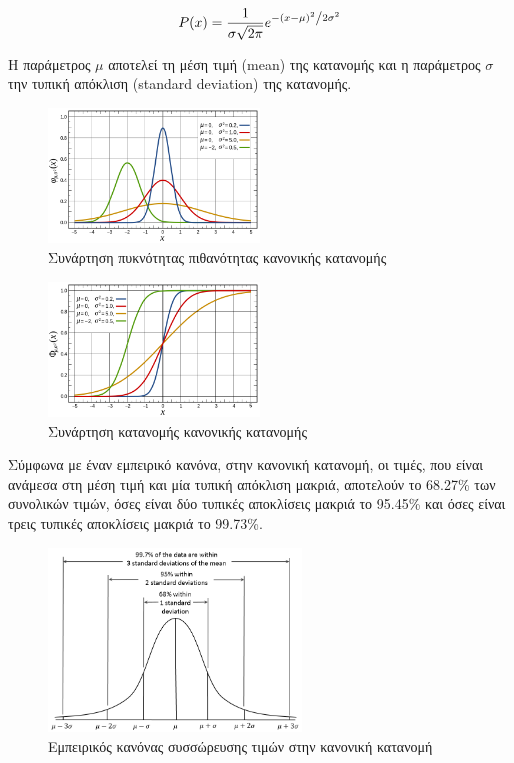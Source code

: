 \[P(x) = \frac{1}{{\sigma \sqrt {2\pi } }}e^{{{ - \left( {x - \mu } \right)^2 } \mathord{\left/ {\vphantom {{ - \left( {x - \mu } \right)^2 } {2\sigma ^2 }}} \right. \kern-\nulldelimiterspace} {2\sigma ^2 }}}\]

Η παράμετρος \(\mu\) αποτελεί τη μέση τιμή (mean) της κατανομής και η παράμετρος \(\sigma\) την τυπική απόκλιση (standard deviation) της κατανομής. 

\begin{figure}[H]
  \centering
  \includegraphics[width=0.5\textwidth]{figures/gauss_1.png}
  \caption{Συνάρτηση πυκνότητας πιθανότητας κανονικής κατανομής}
\end{figure}

\begin{figure}[H]
  \centering
  \includegraphics[width=0.5\textwidth]{figures/gauss_2.png}
  \caption{Συνάρτηση κατανομής κανονικής κατανομής}
\end{figure}

Σύμφωνα με έναν 
εμπειρικό κανόνα, στην κανονική κατανομή, οι τιμές, που είναι ανάμεσα στη μέση τιμή και μία τυπική απόκλιση μακριά, αποτελούν το 68.27\% των συνολικών τιμών, 
όσες είναι δύο τυπικές αποκλίσεις μακριά το 95.45\% και όσες είναι τρεις τυπικές αποκλίσεις μακριά το 99.73\%. 

\begin{figure}[H]
  \centering
  \includegraphics[width=0.6\textwidth]{figures/Empirical_Rule.PNG}
  \caption{Εμπειρικός κανόνας συσσώρευσης τιμών στην κανονική κατανομή}
\end{figure}













